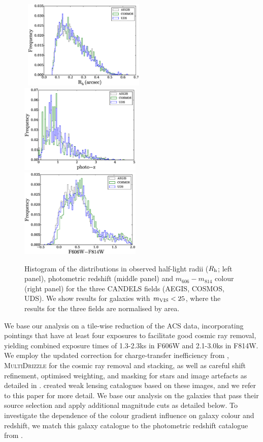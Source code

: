 \documentclass[useAMS,usenatbib]{mnras}
\begin{document}
\begin{figure}
  \hbox{
    \includegraphics[width=5.8cm]{zhisrh.eps}
    \includegraphics[width=5.8cm]{zhisphotoz.eps}
    \includegraphics[width=5.8cm]{zhiscolor.eps}}
  \caption{Histogram of the distributions in observed half-light radii ($R_{\rm h}$; left panel),
  photometric redshift (middle panel) and $m_{606}-m_{814}$ colour (right panel) for the three
  CANDELS fields (AEGIS, COSMOS, UDS). We show results for galaxies with $m_{\rm VIS}<25$,
  where the results for the three fields are normalised by area.}
  \label{fig:datapro1}
\end{figure}
%

We base our analysis on a tile-wise reduction of the ACS data, incorporating pointings that have at least four exposures to facilitate good cosmic ray removal, yielding combined exposure times of 1.3-2.3ks in F606W and 2.1-3.0ks in F814W.  We employ the updated correction for charge-transfer inefficiency from \cite{massey2014}, \textsc{MultiDrizzle} \citep{koekemoer2003} for the cosmic ray removal and stacking, as well as careful shift refinement, optimised weighting, and masking for stars and image artefacts as detailed in \cite{Schrabback10}.  \cite{Schrabback16} created weak lensing catalogues based on these images, and we refer to this paper for more detail.  We base our analysis on the galaxies that pass their source selection and apply additional magnitude cuts as detailed below. To investigate the dependence of the colour gradient influence on galaxy colour and redshift, we match this galaxy catalogue to the photometric redshift catalogue from \cite{skelton14}.
\end{document}
